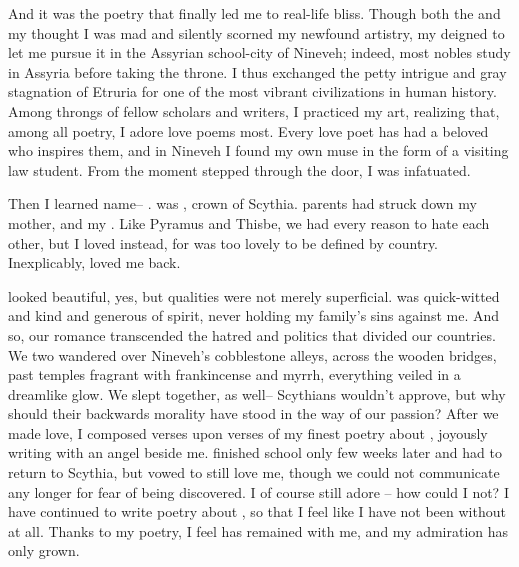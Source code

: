 \documentclass[char]{Kos}
\begin{document}
And it was the poetry that finally led me to real-life bliss. Though both the \cEtruriaKing{\monarch} and my \cGroom{} thought I was mad and silently scorned my newfound artistry, my \cEtruriaKing{\parent} deigned to let me pursue it in the Assyrian school-city of Nineveh; indeed, most nobles study in Assyria before taking the throne. I thus exchanged the petty intrigue and gray stagnation of Etruria for one of the most vibrant civilizations in human history. Among throngs of fellow scholars and writers, I practiced my art, realizing that, among all poetry, I adore love poems most. Every love poet has had a beloved who inspires them, and in Nineveh I found my own muse in the form of a visiting law student. From the moment \cBride{\they} stepped through the door, I was infatuated.

Then I learned \cBride{\their} name-- \cBride{}. \cBride{\They} was \cBride{}, crown \cBride{\prince} of Scythia. \cBride{\Their} parents had struck down my mother, and my \cEtruriaKing{\parent} \cBride{\their} \cFugitive{\sibling}. Like Pyramus and Thisbe, we had every reason to hate each other, but I loved \cBride{\them} instead, for \cBride{\they} was too lovely to be defined by \cBride{\their} country. Inexplicably, \cBride{\they} loved me back.

\cBride{} looked beautiful, yes, but \cBride{\their} qualities were not merely superficial. \cBride{\They} was quick-witted and kind and generous of spirit, never holding my family's sins against me. And so, our romance transcended the hatred and politics that divided our countries. We two wandered over Nineveh's cobblestone alleys, across the wooden bridges, past temples fragrant with frankincense and myrrh, everything veiled in a dreamlike glow. We slept together, as well-- Scythians wouldn't approve, but why should their backwards morality have stood in the way of our passion? After we made love, I composed verses upon verses of my finest poetry about \cBride{\them}, joyously writing with an angel beside me. \cBride{\They} finished school only few weeks later and had to return to Scythia, but \cBride{\they} vowed to still love me, though we could not communicate any longer for fear of being discovered. I of course still adore \cBride{\them}-- how could I not? I have continued to write poetry about \cBride{\them}, so that I feel like I have not been without \cBride{\them} at all. Thanks to my poetry, I feel \cBride{\they} has remained with me, and my admiration has only grown.
\end{document}
